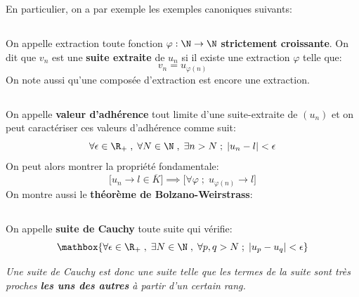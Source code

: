 En particulier, on a par exemple les exemples canoniques suivants:

\subsection*{}
On appelle extraction toute fonction \(\varphi : \N \rightarrow \N\) \textbf{strictement croissante}.\+
On dit que \(v_n\) est une \textbf{suite extraite} de \(u_n\) si il existe une extraction \(\varphi\) telle que:
\[
    v_n = u_{\varphi(n)}
\]
On note aussi qu'une composée d'extraction est encore une extraction.

\subsection*{}
On appelle \textbf{valeur d'adhérence} tout limite d'une suite-extraite de \((u_n)\) et on peut caractériser ces valeurs d'adhérence comme suit:
\[
    \forall \epsilon \in \R_+ \; , \; \forall N \in \N \; , \; \exists n > N \; ; \; |u_n - l| < \epsilon 
\]
On peut alors montrer la propriété fondamentale:
\[
    \Bigr[u_n \rightarrow l \in \overline{K} \Bigr] \implies \Bigr[ \forall \varphi \; ; \; u_{\varphi(n)} \rightarrow l \Bigr]
\]
On montre aussi le \textbf{théorème de Bolzano-Weirstrass}:
\begin{center}
\end{center}

\subsection*{}
On appelle \textbf{suite de Cauchy} toute suite qui vérifie:
\[
    \mathbox{
        \forall \epsilon \in \R_+ \; , \; \exists N \in \N \; , \; \forall p, q > N \; ; \; |u_p - u_q| < \epsilon 
    }
\]
\begin{center}
    \textit{
        Une suite de Cauchy est donc une suite telle que les termes de la suite sont très proches \textbf{les uns des autres} à partir d'un certain rang.
    }
\end{center}


